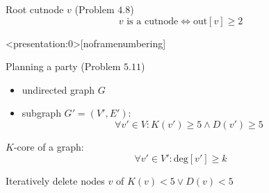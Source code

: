 \begin{frame}
  \begin{exampleblock}{Root cutnode $v$ (Problem $4.8$)}
    \[
      v \text{ is a cutnode} \iff \text{out}[v] \ge 2
    \]
  \end{exampleblock}

  \pause
\end{frame}

\begin{frame}<presentation:0>[noframenumbering]
  \begin{exampleblock}{Planning a party (Problem $5.11$)}
	\begin{itemize}
	  \item undirected graph $G$
	  \item subgraph $G' = (V', E')$:
		\[
		  \forall v' \in V: K(v') \ge 5 \land D(v') \ge 5
		\]
	\end{itemize}
  \end{exampleblock}

  \pause
  \vspace{0.50cm}
  $K$-core of a graph:
  \[
    \forall v' \in V': \text{deg}[v'] \ge k
  \]

  \pause
  \vspace{0.50cm}
  \centerline{Iteratively delete nodes $v$ of $K(v) < 5 \lor D(v) < 5$}
\end{frame}
